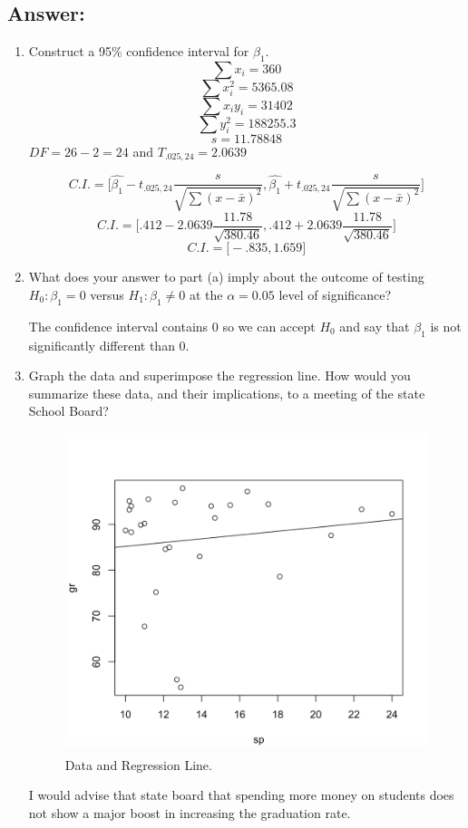\documentclass[svgnames]{article}
\begin{document}
\subsection*{Answer:}
\begin{enumerate}[label=\alph*]
\item Construct a 95\% confidence interval for $\beta _1$.
$$\sum x_i=360$$
$$\sum x_i^2=5365.08$$
$$\sum x_iy_i=31402$$
$$\sum y_i^2=188255.3$$
$$s=11.78848$$
$DF=26-2=24$ and $T_{.025,24}=2.0639$

$$C.I.=\big[\hat{\beta_1}-t_{.025,24}\frac{s}{\sqrt{\sum(x-\bar{x})^2}}, \hat{\beta_1}+t_{.025,24}\frac{s}{\sqrt{\sum(x-\bar{x})^2}}\big]$$
$$C.I.=\big[.412-2.0639\frac{11.78}{\sqrt{380.46}},.412+2.0639\frac{11.78}{\sqrt{380.46}}]$$
$$C.I.=\big[-.835,1.659]$$
\item What does your answer to part (a) imply about the outcome of testing $H_0: \beta_1 = 0$ versus $H_1: \beta_1 \neq 0$ at the $\alpha = 0.05$ level of significance?

The confidence interval contains 0 so we can accept $H_0$ and say that $\beta_1$ is not significantly different than 0.
\item  Graph the data and superimpose the regression line. How would you summarize these data, and their implications, to a meeting of the state School Board?
\begin{figure}
\includegraphics[width=\linewidth]{graph}
\caption{Data and Regression Line.}
\end{figure}
\newline
I would advise that state board that spending more money on students does not show a major boost in increasing the graduation rate. 
\end{enumerate}
\end{document}

